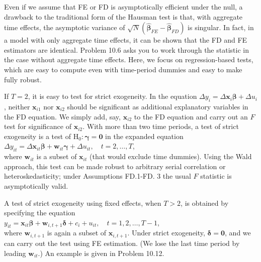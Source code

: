 \documentclass[10pt]{article}
\begin{document}
Even if we assume that FE or FD is asymptotically efficient under the null, a drawback to the traditional form of the Hausman test is that, with aggregate time effects, the asymptotic variance of $\sqrt{N}\left(\hat{\boldsymbol{\beta}}_{F E}-\hat{\boldsymbol{\beta}}_{F D}\right)$ is singular. In fact, in a model with only aggregate time effects, it can be shown that the FD and FE estimators are identical. Problem 10.6 asks you to work through the statistic in the case without aggregate time effects. Here, we focus on regression-based tests, which are easy to compute even with time-period dummies and easy to make fully robust.

If $T=2$, it is easy to test for strict exogeneity. In the equation $\Delta y_{i}=\Delta \mathbf{x}_{i} \boldsymbol{\beta}+\Delta u_{i}$, neither $\mathbf{x}_{i 1}$ nor $\mathbf{x}_{i 2}$ should be significant as additional explanatory variables in the FD equation. We simply add, say, $\mathbf{x}_{i 2}$ to the FD equation and carry out an $F$ test for significance of $\mathbf{x}_{i 2}$. With more than two time periods, a test of strict exogeneity is a test of $\mathrm{H}_{0}: \boldsymbol{\gamma}=\mathbf{0}$ in the expanded equation\\
$\Delta y_{i t}=\Delta \mathbf{x}_{i t} \boldsymbol{\beta}+\mathbf{w}_{i t} \boldsymbol{\gamma}+\Delta u_{i t}, \quad t=2, \ldots, T$,\\
where $\mathbf{w}_{i t}$ is a subset of $\mathbf{x}_{i t}$ (that would exclude time dummies). Using the Wald approach, this test can be made robust to arbitrary serial correlation or heteroskedasticity; under Assumptions FD.1-FD. 3 the usual $F$ statistic is asymptotically valid.

A test of strict exogeneity using fixed effects, when $T>2$, is obtained by specifying the equation\\
$y_{i t}=\mathbf{x}_{i t} \boldsymbol{\beta}+\mathbf{w}_{i, t+1} \boldsymbol{\delta}+c_{i}+u_{i t}, \quad t=1,2, \ldots, T-1$,\\
where $\mathbf{w}_{i, t+1}$ is again a subset of $\mathbf{x}_{i, t+1}$. Under strict exogeneity, $\boldsymbol{\delta}=\mathbf{0}$, and we can carry out the test using FE estimation. (We lose the last time period by leading $\mathbf{w}_{i t}$.) An example is given in Problem 10.12.
\end{document}
